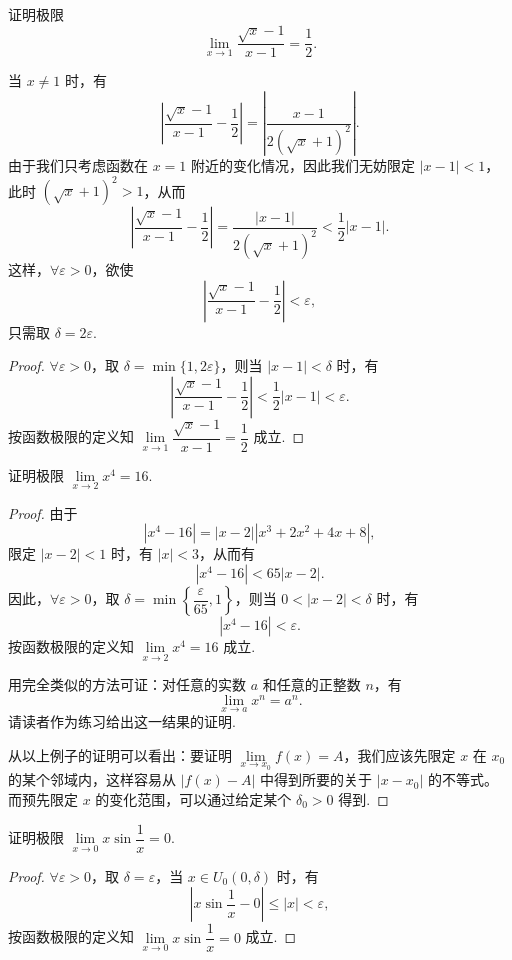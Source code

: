 \begin{example}\label{example:ma-3-1-1}
证明极限
\[
  \lim_{x\to1}\frac{\sqrt{x}-1}{x-1}=\frac12.
\]
\end{example}


\begin{analyze}
当 $x\ne1$ 时，有
\[
  \left|\frac{\sqrt{x}-1}{x-1}-\frac12\right|
  =\left|\frac{x-1}{2(\sqrt{x}+1)^2}\right|.
\]
由于我们只考虑函数在 $x=1$ 附近的变化情况，因此我们无妨限定 $|x-1|<1$，此时 $(\sqrt{x}+1)^2>1$，从而
\[
  \left|\frac{\sqrt{x}-1}{x-1}-\frac12\right|
  =\frac{|x-1|}{2(\sqrt{x}+1)^2}<\frac12|x-1|.
\]
这样，$\forall\varepsilon>0$，欲使
\[
  \left|\frac{\sqrt{x}-1}{x-1}-\frac12\right|<\varepsilon,
\]
只需取 $\delta=2\varepsilon$.
\end{analyze}


\begin{proof}
$\forall\varepsilon>0$，取 $\delta=\min\{1,2\varepsilon\}$，则当 $|x-1|<\delta$ 时，有
\[
  \left|\frac{\sqrt{x}-1}{x-1}-\frac12\right|
  <\frac12|x-1|<\varepsilon.
\]
按函数极限的定义知 $\lim\limits_{x\to1}\dfrac{\sqrt{x}-1}{x-1}=\dfrac12$ 成立.
\end{proof}


\begin{example}\label{example:ma-3-1-2}
证明极限 $\lim\limits_{x\to2}x^4=16$.
\end{example}


\begin{proof}
由于
\[
  |x^4-16|=|x-2||x^3+2x^2+4x+8|,
\]
限定 $|x-2|<1$ 时，有 $|x|<3$，从而有
\[
  |x^4-16|<65|x-2|.
\]
因此，$\forall\varepsilon>0$，取 $\delta=\min\left\{\dfrac{\varepsilon}{65},1\right\}$，则当 $0<|x-2|<\delta$ 时，有
\[
  |x^4-16|<\varepsilon.
\]
按函数极限的定义知 $\lim\limits_{x\to2}x^4=16$ 成立.

用完全类似的方法可证：对任意的实数 $a$ 和任意的正整数 $n$，有
\[
  \lim_{x\to a}x^n=a^n.
\]
请读者作为练习给出这一结果的证明.

从以上例子的证明可以看出：要证明 $\lim\limits_{x\to x_0}f(x)=A$，我们应该先限定 $x$ 在 $x_0$ 的某个邻域内，这样容易从 $|f(x)-A|$ 中得到所要的关于 $|x-x_0|$ 的不等式。而预先限定 $x$ 的变化范围，可以通过给定某个 $\delta_0>0$ 得到.
\end{proof}


\begin{example}\label{example:ma-3-1-3}
证明极限 $\lim\limits_{x\to0}x\sin\dfrac1x=0$.
\end{example}


\begin{proof}
$\forall\varepsilon>0$，取 $\delta=\varepsilon$，当 $x\in U_0(0,\delta)$ 时，有
\[
  \left|x\sin\frac1x-0\right|\leqslant |x|<\varepsilon,
\]
按函数极限的定义知 $\lim\limits_{x\to0}x\sin\dfrac1x=0$ 成立.
\end{proof}


